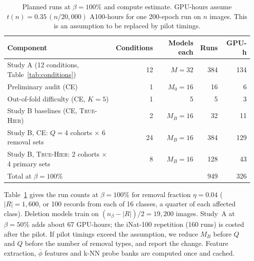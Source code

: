 \documentclass{article} %
\newcommand{\cn}[1]{\textsc{#1}}
\begin{document}
\begin{table}[!ht]
\caption{Planned runs at $\beta=100\%$ and compute estimate. GPU-hours assume $t(n)=0.35\,(n/20{,}000)$ A100-hours for one 200-epoch run on $n$ images. This is an assumption to be replaced by pilot timings.}
\label{tab:compute}
\begin{center}
\small
\begin{tabular}{@{}lrrrr@{}}
\toprule
Component & Conditions & Models each & Runs & GPU-h \\
\midrule
Study A (12 conditions, Table~\ref{tab:conditions}) & 12 & $M=32$ & 384 & 134 \\
Preliminary audit (\cn{CE}) & 1 & $M_0=16$ & 16 & 6 \\
Out-of-fold difficulty (\cn{CE}, $K=5$) & 1 & 5 & 5 & 3 \\
Study B baselines (\cn{CE}, \cn{True-Hier}) & 2 & $M_B=16$ & 32 & 11 \\
Study B, \cn{CE}: $Q=4$ cohorts $\times$ 6 removal sets & 24 & $M_B=16$ & 384 & 129 \\
Study B, \cn{True-Hier}: 2 cohorts $\times$ 4 primary sets & 8 & $M_B=16$ & 128 & 43 \\
\midrule
Total at $\beta=100\%$ & & & 949 & 326 \\
\bottomrule
\end{tabular}
\end{center}
\end{table}

Table~\ref{tab:compute} gives the run counts at $\beta=100\%$ for removal fraction $\eta=0.04$ ($|R|=1{,}600$, or 100 records from each of 16 classes, a quarter of each affected class). Deletion models train on $(n_\beta-|R|)/2=19{,}200$ images. Study~A at $\beta=50\%$ adds about 67 GPU-hours; the iNat-100 repetition (160 runs) is costed after the pilot. If pilot timings exceed the assumption, we reduce $M_B$ before $Q$ and $Q$ before the number of removal types, and report the change. Feature extraction, $\bar\phi$ features and k-NN probe banks are computed once and cached.
\end{document}
